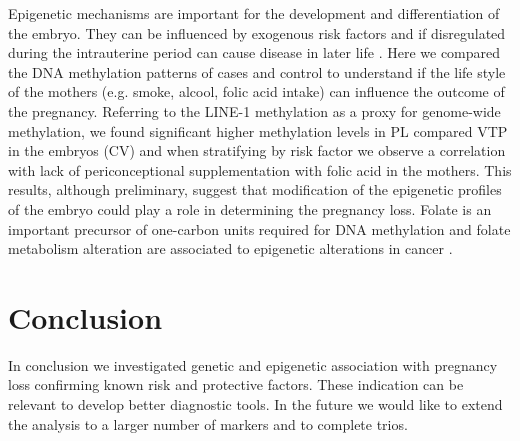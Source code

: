 \documentclass[10pt,letterpaper]{article}
\begin{document}
\noindent Epigenetic mechanisms are important for the development and differentiation of the embryo. They can be influenced by exogenous risk factors \cite{godderis2015global} and if disregulated during the intrauterine period can cause disease in later life \cite{breton2009prenatal}. Here we compared the DNA methylation patterns of cases and control to understand if the life style of the mothers (e.g. smoke, alcool, folic acid intake) can influence the outcome of the pregnancy. Referring to the LINE-1 methylation as a proxy for genome-wide methylation, we found significant higher methylation levels in PL compared VTP in the embryos (CV) and when stratifying by risk factor we observe a correlation with lack of periconceptional supplementation with folic acid in the mothers. This results, although preliminary, suggest that modification of the epigenetic profiles of the embryo could play a role in determining the pregnancy loss. Folate is an important precursor of one-carbon units required for DNA methylation and folate metabolism alteration are associated to epigenetic alterations in cancer \cite{jin2009different}. 

\section*{Conclusion}

In conclusion we investigated genetic and epigenetic association with pregnancy loss confirming known risk and protective factors. These indication can be relevant to develop better diagnostic tools. In the future we would like to extend the analysis to a larger number of markers and to complete trios. 


\end{document}
